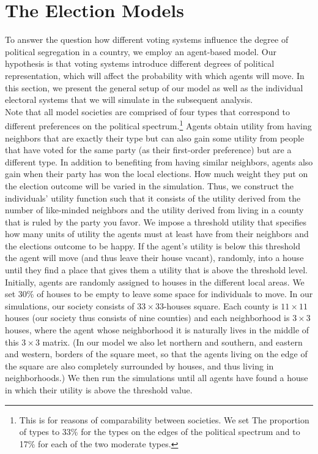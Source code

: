 \documentclass[12pt, a4paper]{article}
\begin{document}
\section{\label{model}The Election Models}
To answer the question how different voting systems influence the degree of political segregation in a country, we employ an agent-based model. Our hypothesis is that voting systems introduce different degrees of political representation, which will affect the probability with which agents will move. In this section, we present the general setup of our model as well as the individual electoral systems that we will simulate in the subsequent analysis.\\%
Note that all model societies are comprised of four types that correspond to different preferences on the political spectrum.\footnote{This is for reasons of comparability between societies. We set The proportion of types to 33\% for the types on the edges of the political spectrum and to 17\% for each of the two moderate types.} Agents obtain utility from having neighbors that are exactly their type but can also gain some utility from people that have voted for the same party (as their first-order preference) but are a different type. In addition to benefiting from having similar neighbors, agents also gain when their party has won the local elections. How much weight they put on the election outcome will be varied in the simulation.
Thus, we construct the individuals' utility function such that it consists of the utility derived from the number of like-minded neighbors and the utility derived from living in a county that is ruled by the party you favor.
We impose a threshold utility that specifies how many units of utility the agents must at least have from their neighbors and the elections outcome to be happy. If the agent's utility is below this threshold the agent will move (and thus leave their house vacant), randomly, into a house until they find a place that gives them a utility that is above the threshold level. Initially, agents are randomly assigned to houses in the different local areas. We set 30\% of houses to be empty to leave some space for individuals to move.
 In our simulations, our society consists of $33\times33$-houses square. Each county is $11\times11$ houses (our society thus consists of nine counties) and each neighborhood is $3\times3$ houses, where the agent whose neighborhood it is naturally lives in the middle of this $3\times3$ matrix. (In our model we also let northern and southern, and eastern and western, borders of the square meet, so that the agents living on the edge of the square are also completely surrounded by houses, and thus living in neighborhoods.)
We then run the simulations until all agents have found a house in which their utility is above the threshold value. %
\end{document}
